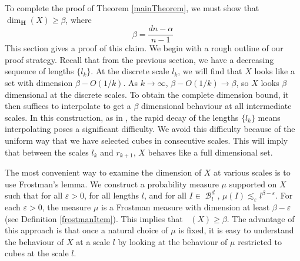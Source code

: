 \documentclass[dvipsnames,letterpaper,12pt]{article}
\numberwithin{equation}{section}
\theoremstyle{plain}
\DeclareMathOperator{\hausdim}{\dim_{\mathbf{H}}}
\DeclareMathOperator{\B}{\mathcal{B}}
\begin{document}
To complete the proof of Theorem \ref{mainTheorem}, we must show that $\dim_{\mathbf{H}}(X) \geq \beta$, where
%
\[ \beta = \frac{dn - \alpha}{n - 1} \]
%
This section gives a proof of this claim. We begin with a rough outline of our proof strategy. Recall that from the previous section, we have a decreasing sequence of lengths $\{ l_k \}$. At the discrete scale $l_k$, we will find that $X$ looks like a set with dimension $\beta - O(1/k)$. As $k \to \infty$, $\beta - O(1/k) \to \beta$, so $X$ looks $\beta$ dimensional at the discrete scales. To obtain the complete dimension bound, it then suffices to interpolate to get a $\beta$ dimensional behaviour at all intermediate scales. In this construction, as in \cite{MalabikaRob}, the rapid decay of the lengths $\{ l_k \}$ means interpolating poses a significant difficulty. We avoid this difficulty because of the uniform way that we have selected cubes in consecutive scales. This will imply that between the scales $l_k$ and $r_{k+1}$, $X$ behaves like a full dimensional set.

The most convenient way to examine the dimension of $X$ at various scales is to use Frostman's lemma. We construct a probability measure $\mu$ supported on $X$ such that for all $\varepsilon > 0$, for all lengths $l$, and for all $I \in \B^d_l$, $\mu(I) \lesssim_\varepsilon l^{\beta - \varepsilon}$. For each $\varepsilon > 0$, the measure $\mu$ is a Frostman measure with dimension at least $\beta - \varepsilon$ (see Definition \ref{frostmanItem}). This implies that $\hausdim(X) \geq \beta$. The advantage of this approach is that once a natural choice of $\mu$ is fixed, it is easy to understand the behaviour of $X$ at a scale $l$ by looking at the behaviour of $\mu$ restricted to cubes at the scale $l$.
\end{document}
